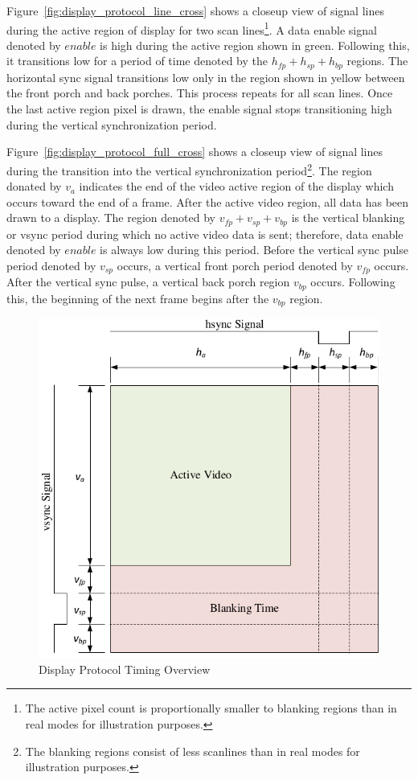     Figure~\ref{fig:display_protocol_line_cross} shows a closeup view of signal lines during the active region of display for two scan lines\footnote{The active pixel count is proportionally smaller to blanking regions than in real modes for illustration purposes.}. A data enable signal denoted by $enable$ is high during the active region shown in green. Following this, it transitions low for a period of time denoted by the $h_{fp}+h_{sp}+h_{bp}$ regions. The horizontal sync signal transitions low only in the region shown in yellow between the front porch and back porches. This process repeats for all scan lines. Once the last active region pixel is drawn, the enable signal stops transitioning high during the vertical synchronization period.

    Figure~\ref{fig:display_protocol_full_cross} shows a closeup view of signal lines during the transition into the vertical synchronization period\footnote{The blanking regions consist of less scanlines than in real modes for illustration purposes.}. The region donated by $v_a$ indicates the end of the video active region of the display which occurs toward the end of a frame. After the active video region, all data has been drawn to a display. The region denoted by $v_{fp}+v_{sp}+v_{bp}$ is the vertical blanking or vsync period during which no active video data is sent; therefore, data enable denoted by $enable$ is always low during this period. Before the vertical sync pulse period denoted by $v_{sp}$ occurs, a vertical front porch period denoted by $v_{fp}$ occurs. After the vertical sync pulse, a vertical back porch region $v_{bp}$ occurs. Following this, the beginning of the next frame begins after the $v_{bp}$ region.

    \begin{figure}[H]
        \centering
        \includegraphics[width=1.0\textwidth]{fig/display_timing_overview.pdf}
        \caption{Display Protocol Timing Overview}
        \label{fig:display_protocol_timing_overview}
    \end{figure}

